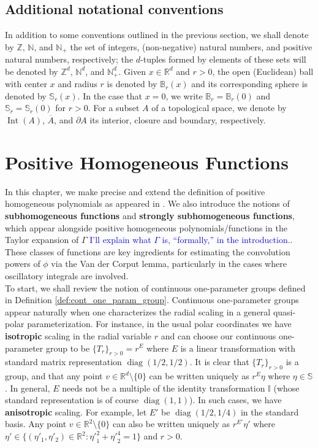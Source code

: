 \documentclass[11pt, letter]{book}
\newcommand\diag{\operatorname{diag}}
\newcommand\Interior{\operatorname{Int}}
\begin{document}
\section{Additional notational conventions}
In addition to some conventions outlined in the previous section, we shall denote by $\mathbb{Z}$, $\mathbb{N}$, and $\mathbb{N}_+$ the set of integers, (non-negative) natural numbers, and positive natural numbers, respectively; the $d$-tuples formed by elements of these sets will be denoted by $\mathbb{Z}^d$, $\mathbb{N}^d$, and $\mathbb{N}_+^d$. Given $x\in\mathbb{R}^d$ and $r>0$, the open (Euclidean) ball with center $x$ and radius $r$ is denoted by $\mathbb{B}_r(x)$ and its corresponding sphere is denoted by $\mathbb{S}_r(x)$. In the case that $x=0$, we write $\mathbb{B}_r=\mathbb{B}_r(0)$ and $\mathbb{S}_r=\mathbb{S}_r(0)$ for $r>0$. For a subset $A$ of a topological space, we denote by $\Interior{(A)}$, $\overline{A}$, and $\partial A$ its interior, closure and boundary, respectively.


\chapter{Positive Homogeneous Functions}\label{chap:pos-hom-fns}

In this chapter, we make precise and extend the definition of positive homogeneous polynomials as appeared in \cite{randles_convolution_2017}. We also introduce the notions of \textbf{subhomogeneous functions} and \textbf{strongly subhomogeneous functions}, which appear alongside positive homogeneous polynomials/functions in the Taylor expansion of $\Gamma$ \textcolor{blue}{I'll explain what $\Gamma$ is, ``formally,'' in the introduction.}. These classes of functions are key ingredients for estimating the convolution powers of $\phi$ via the Van der Corput lemma, particularly in the cases where oscillatory integrals are involved.\\

\noindent To start, we shall review the notion of continuous one-parameter groups defined in Definition \ref{def:cont_one_param_group}. Continuous one-parameter groups appear naturally when one characterizes the radial scaling in a general quasi-polar parameterization. For instance, in the usual polar coordinates we have \textbf{isotropic} scaling in the radial variable $r$ and can choose our continuous one-parameter group to be $\{T_r \}_{r>0} = r^E$ where $E$ is a linear transformation with standard matrix representation $\diag(1/2, 1/2)$. It is clear that $\{T_r \}_{r>0}$ is a group, and that any point $v\in \mathbb{R}^d \setminus \{0\}$ can be written uniquely as $r^E \eta$ where $\eta\in \mathbb{S}$. In general, $E$ needs not be a multiple of the identity transformation $\mathbb{I}$ (whose standard representation is of course $\diag(1,1)$). In such cases, we have \textbf{anisotropic} scaling. For example, let $E'$ be $\diag(1/2, 1/4)$ in the standard basis. Any point $v\in \mathbb{R}^2\setminus\{0\}$ can also be written uniquely as $r^{E'}\eta'$ where $\eta' \in \{ (\eta'_1,\eta'_2) \in \mathbb{R}^2 : {\eta'}_1^{2} + {\eta'}_2^{4} = 1  \}$ and $r> 0$. 
\end{document}
